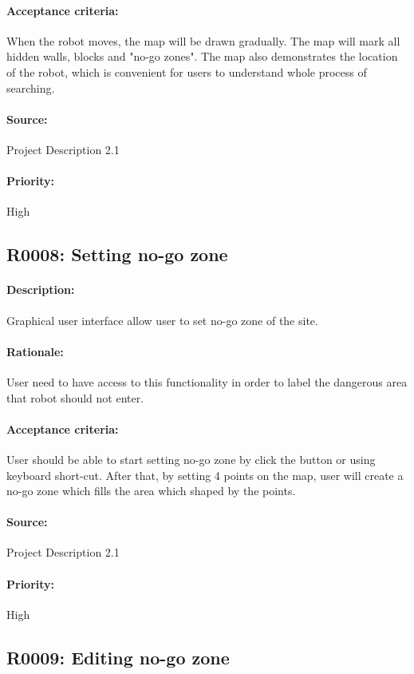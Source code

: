 \documentclass[11pt, a4paper]{report}
\begin{document}
\paragraph{Acceptance criteria:}
When the robot moves, the map will be drawn gradually. The map will mark all hidden walls, blocks and "no-go zones". The map also demonstrates the location of the robot, which is convenient for users to understand whole process of searching.
\paragraph{Source:}
Project Description 2.1
\paragraph{Priority:}
High

\subsection{R0008: Setting no-go zone}
\paragraph{Description:}
Graphical user interface allow user to set no-go zone of the site.
\paragraph{Rationale:}
User need to have access to this functionality in order to label the dangerous area that robot should not enter.
\paragraph{Acceptance criteria:}
User should be able to start setting no-go zone by click the button or using keyboard short-cut. After that, by setting 4 points on the map, user will create a no-go zone which fills the area which shaped by the points.
\paragraph{Source:}
Project Description 2.1
\paragraph{Priority:}
High


\subsection{R0009: Editing no-go zone}
\end{document}
